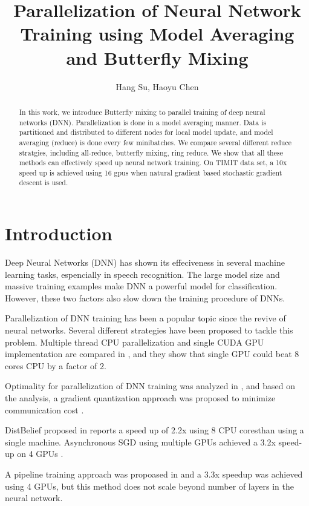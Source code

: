 \documentclass{article}
\title{Parallelization of Neural Network Training using Model Averaging and Butterfly Mixing}
\author{Hang Su, Haoyu Chen}
\date{}
\begin{document}
%
\maketitle
%
\begin{abstract}
In this work, we introduce Butterfly mixing to parallel training of deep neural networks (DNN). Parallelization is done
in a model averaging manner. Data is partitioned and distributed to different nodes for local model update, and
model averaging (reduce) is done every few minibatches. We compare several different reduce stratgies, including
all-reduce, butterfly mixing, ring reduce. We show that all these methods can effectively
speed up neural network training. On TIMIT data set, a 10x speed up is achieved using 16 gpus when natural gradient
based stochastic gradient descent is used.
\end{abstract}
%
%
\section{Introduction}
\label{sec:intro}
Deep Neural Networks (DNN) has shown its effeciveness in several machine learning tasks, espencially in speech
recognition. The large model size and massive training examples make DNN a powerful model for classification. However,
these two factors also slow down the training procedure of DNNs.

Parallelization of DNN training has been a popular topic since the revive of neural networks. Several different strategies
have been proposed to tackle this problem. Multiple thread CPU parallelization and single CUDA GPU implementation are compared
in \cite{scanzio2010parallel,vesely2010parallel}, and they show that single GPU could beat 8 cores CPU by a factor of 2.

Optimality for parallelization of DNN training was analyzed in \cite{seide2014parallelizability}, and based on the analysis, 
a gradient quantization approach was proposed to minimize communication cost \cite{seide20141}.

DistBelief proposed in \cite{dean2012large} reports a speed up of 2.2x using 8 CPU coresthan using a
single machine. Asynchronous SGD using multiple GPUs achieved a 3.2x speed-up on 4 GPUs \cite{zhang2013asynchronous}.

A pipeline training approach was propoased in \cite{chen2012pipelined} and a 3.3x speedup was achieved using 4 GPUs, but this
method does not scale beyond number of layers in the neural network.
\end{document}
